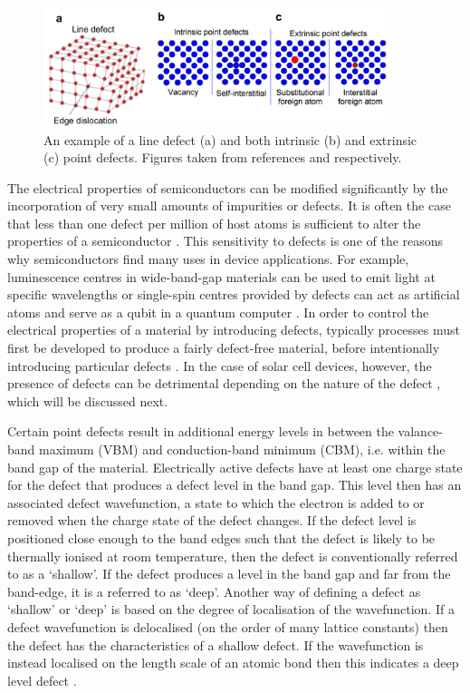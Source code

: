\documentclass[11pt, twoside]{report}
\begin{document}
\begin{figure}[h!]
  \centering
    \includegraphics[width=0.9\textwidth]{figures/defects.png}
    \caption{An example of a line defect (a) and both intrinsic (b) and extrinsic (c) point defects. Figures taken from references  and  respectively.}
  \label{defects}
\end{figure}

The electrical properties of semiconductors can be modified significantly by the incorporation of very small amounts of impurities or defects. It is often the case that less than one defect per million of host atoms is sufficient to alter the properties of a semiconductor \cite{fund_semi}. This sensitivity to defects is one of the reasons why semiconductors find many uses in device applications. For example, luminescence centres in wide-band-gap materials can be used to emit light at specific wavelengths or single-spin centres provided by defects can act as artificial atoms and serve as a qubit in a quantum computer \cite{defects_tutorial}. In order to control the electrical properties of a material by introducing defects, typically processes must first be developed to produce a fairly defect-free material, before intentionally introducing particular defects \cite{fund_semi}. In the case of solar cell devices, however, the presence of defects can be detrimental depending on the nature of the defect \cite{Aron_defect_tolerance}, which will be discussed next. 

Certain point defects result in additional energy levels in between the valance-band maximum (VBM) and conduction-band minimum (CBM), i.e. within the band gap of the material. Electrically active defects have at least one charge state for the defect that produces a defect level in the band gap. This level then has an associated defect wavefunction, a state to which the electron is added to or removed when the charge state of the defect changes. If the defect level is positioned close enough to the band edges such that the defect is likely to be thermally ionised at room temperature, then the defect is conventionally referred to as a `shallow'. If the defect produces a level in the band gap and far from the band-edge, it is a referred to as `deep'.  Another way of defining a defect as `shallow' or `deep' is based on the degree of localisation of the wavefunction. If a defect wavefunction is delocalised (on the order of many lattice constants) then the defect has the characteristics of a shallow defect. If the wavefunction is instead localised on the length scale of an atomic bond then this indicates a deep level defect \cite{defects_tutorial}. 
\end{document}
